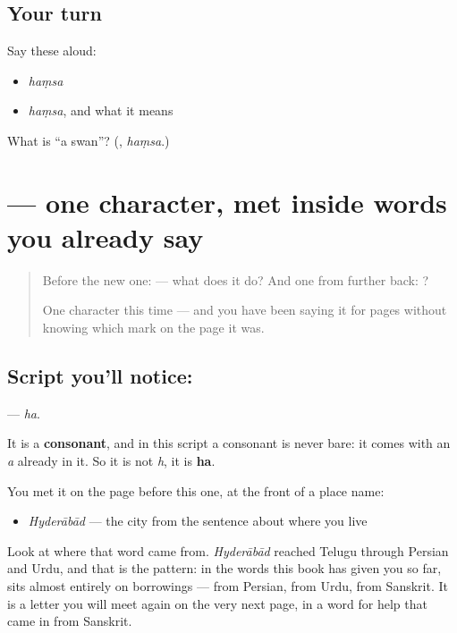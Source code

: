 \subsection*{Your turn}
Say these aloud:

\begin{itemize}
\raggedright
  \item \emph{haṃsa}
  \item \emph{haṃsa}, and what it means
\end{itemize}

\begin{tcolorbox}[breakable,colback=teal!4,colframe=teal!35!black,title={Before you move on}]
What is \textquotedblleft{}a swan\textquotedblright{}? (\textbf{}, \emph{haṃsa}.)
\end{tcolorbox}
\section[\texorpdfstring{\te{హ} (ha)}{హ (ha)}]{ — one character, met inside words you already say}

\label{lesson:TE-S125-letter-ha}



\begin{quote}
Before the new one:  — what does it do? And one from further back: ?

One character this time — and you have been saying it for pages without knowing which mark on the page it was.
\end{quote}

\subsection*{Script you'll notice: }
\textbf{} — \emph{ha}.

It is a \textbf{consonant}, and in this script a consonant is never bare: it comes with an \emph{a} already in it. So it is not \emph{h}, it is \textbf{ha}.

You met it on the page before this one, at the front of a place name:

\begin{itemize}
\raggedright
  \item \textbf{} \emph{Hyderābād} — the city from the sentence about where you live
\end{itemize}

Look at where that word came from. \emph{Hyderābād} reached Telugu through Persian and Urdu, and that is the pattern: in the words this book has given you so far,  sits almost entirely on borrowings — from Persian, from Urdu, from Sanskrit. It is a letter you will meet again on the very next page, in a word for help that came in from Sanskrit.

